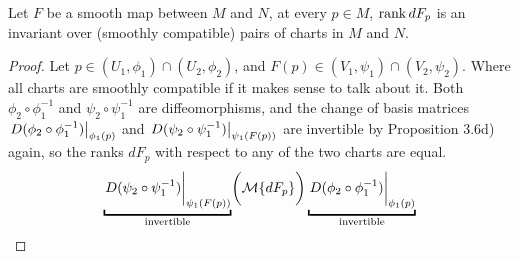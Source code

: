 \documentclass[../main-manifolds.tex]{subfiles}
\begin{document}
\begin{wts}\label{lee-chap3:rank-of-differential-invariant-under-coordinate-change}
    Let $F$ be a smooth map between $M$ and $N$, at every $p\in M$, $\operatorname{rank} dF_p$ is an invariant over (smoothly compatible) pairs of charts in $M$ and $N$.
\end{wts}
\begin{proof}
    Let $p\in (U_1,\phi_1)\cap (U_2,\phi_2)$, and $F(p)\in (V_1,\psi_1)\cap (V_2,\psi_2)$. Where all charts are smoothly compatible if it makes sense to talk about it. Both $\phi_2\circ\phi_1^{-1}$ and $\psi_2\circ\psi_1^{-1}$ are diffeomorphisms, and the change of basis matrices $\eval{D(\phi_2\circ\phi_1^{-1})}_{\phi_1(p)}$ and $\eval{D(\psi_2\circ\psi_1^{-1})}_{\psi_1(F(p))}$ are invertible by Proposition 3.6d) again, so the ranks $dF_p$ with respect to any of the two charts are equal.
    \[
        \underbracket{\eval{D(\psi_2\circ\psi_1^{-1})}_{\psi_1(F(p))}}_{\text{invertible}}\biggl(\mcal\{dF_p\}\biggr)\underbracket{\eval{D(\phi_2\circ\phi_1^{-1})}_{\phi_1(p)}}_{\text{invertible}}
    \]
\end{proof}
\end{document}
